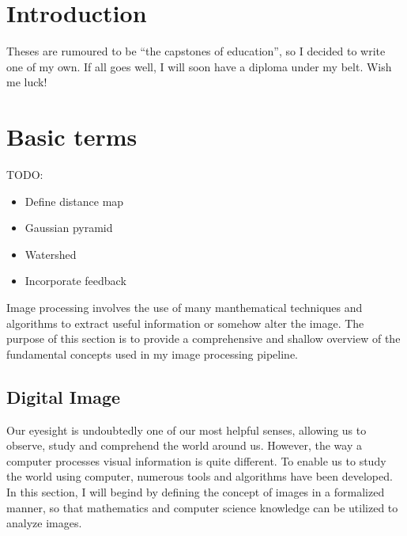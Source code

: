 \documentclass[
  digital,     %
  oneside,     %
  nosansbold,  %
  nocolorbold, %
  lof,         %
  lot,         %
]{fithesis4}
\begin{document}
\chapter*{Introduction}

Theses are rumoured to be \enquote{the capstones of education}, so
I decided to write one of my own. If all goes well, I will soon
have a diploma under my belt. Wish me luck!

\chapter{Basic terms}

TODO:
\begin{itemize}
    \item{Define distance map}
    \item{Gaussian pyramid}
    \item{Watershed}
    \item{Incorporate feedback}
\end{itemize}

Image processing involves the use of many manthematical techniques and
algorithms to extract useful information or somehow alter the image. The purpose
of this section is to provide a comprehensive and shallow overview of the
fundamental concepts used in my image processing pipeline.

\section{Digital Image}
Our eyesight is undoubtedly one of our most helpful senses, allowing us to
observe, study and comprehend the world around us. However, the way a computer
processes visual information is quite different. To enable us to study the world
using computer, numerous tools and algorithms have been developed. In this
section, I will begind by defining the concept of images in a formalized manner,
so that mathematics and computer science knowledge can be utilized to analyze
images.
\end{document}

